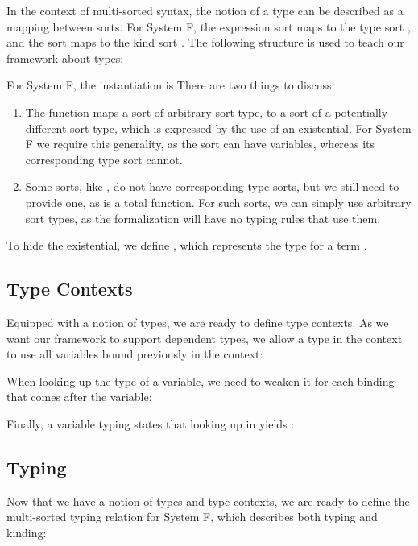 \documentclass[a4paper, UKenglish, cleveref, autoref, thm-restate]{lipics-v2021}
\newenvironment{LibCode*}{%
  \begin{tcolorbox}[%
    colframe=white,%
    boxrule=0.0pt,%
    top=2.5pt,%
    left=2.5pt,%
    bottom=2.5pt,%
    right=2.5pt,%
    before skip=5pt,%
    after skip=5pt,%
    boxsep=0pt%
  ]
}{%
  \end{tcolorbox}%
}
\newcommand*\LibCode[1]{\begin{LibCode*}{#1}\end{LibCode*}}
\newcommand*\AppCode[1]{{#1}}
\newcommand*\ACode[1]{\AgdaFontStyle{\textcolor{mygray}{#1}}}
\newcommand*\AField[1]{\AgdaField{#1}}
\newcommand*\ACon[1]{\AgdaInductiveConstructor{#1}}
\newcommand*\ADef[1]{\AgdaFunction{#1}}
\begin{document}
  In the context of multi-sorted syntax, the notion of a type can be
  described as a mapping between sorts.
  For System F, the expression sort \ACode{\ACon{𝕖}} maps to the type sort
  \ACode{\ACon{𝕥}}, and the sort \ACode{\ACon{𝕥}} maps to the kind sort
  \ACode{\ACon{𝕜}}.
  The following structure is used to teach our framework about types:
  \LibCode\KTypeSorts
  For System F, the instantiation is
  \AppCode\FTypes
  There are two things to discuss:
  \begin{enumerate}
  \item
    The \ACode{\AField{↑ᵗ}} function maps a sort of arbitrary sort type,
    to a sort of a potentially different sort type, which is expressed
    by the use of an existential.
    For System F we require this generality, as the sort
    \ACode{\ACon{𝕥}} can have variables, whereas its corresponding type
    sort \ACode{\ACon{𝕜}} cannot.
  \item
    Some sorts, like \ACode{\ACon{𝕜}}, do not have corresponding type
    sorts, but we still need to provide one, as \ACode{\AField{↑ᵗ}} is a
    total function.
    For such sorts, we can simply use arbitrary sort types, as the
    formalization will have no typing rules that use them.
  \end{enumerate}
  To hide the existential, we define \ACode{S \ACon{∶⊢} s}, which represents
  the type for a term \ACode{S \ACon{⊢} s}.
  \LibCode\KTypes

  \subsection{Type Contexts}
  Equipped with a notion of types, we are ready to define type contexts.
  As we want our framework to support dependent types, we allow a type
  in the context to use all variables bound previously in the context:
  \LibCode\KContexts

  When looking up the type of a variable, we need to weaken it for each
  binding that comes after the variable:
  \LibCode\KContextLookup

  Finally, a variable typing \ACode{Γ \ADef{∋} x \ADef{∶} t}
  states that looking up \ACode{x} in \ACode{Γ} yields \ACode{t}:
  \LibCode\KVariableTyping

  \subsection{Typing}
  \label{sec:types:typing}
  Now that we have a notion of types and type contexts, we are ready to define
  the multi-sorted typing relation for System F, which describes both
  typing and kinding:
  \AppCode\FTyping
\end{document}
